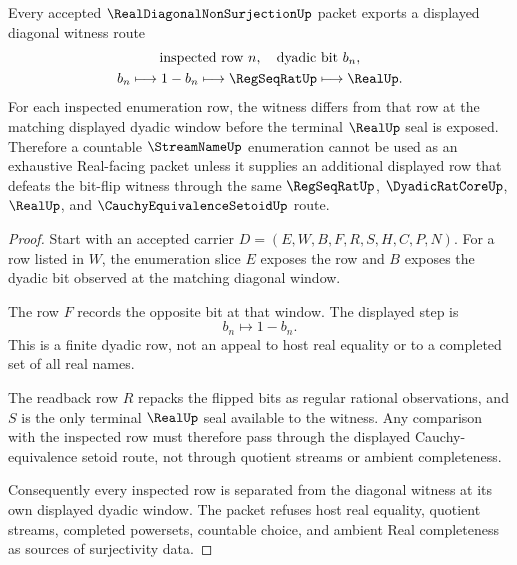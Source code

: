 \begin{theorem}
\label{thm:real-diagonal-non-surjection-diagonal-witness}
Every accepted $\RealDiagonalNonSurjectionUp$ packet exports a displayed diagonal witness route
$$
\begin{gathered}
\text{inspected row } n,\quad \text{dyadic bit } b_n,\\
b_n \longmapsto 1-b_n \longmapsto \RegSeqRatUp \longmapsto \RealUp .
\end{gathered}
$$
For each inspected enumeration row, the witness differs from that row at the matching displayed dyadic window before the terminal $\RealUp$ seal is exposed. Therefore a countable $\StreamNameUp$ enumeration cannot be used as an exhaustive Real-facing packet unless it supplies an additional displayed row that defeats the bit-flip witness through the same $\RegSeqRatUp$, $\DyadicRatCoreUp$, $\RealUp$, and $\CauchyEquivalenceSetoidUp$ route.
\end{theorem}
\begin{proof}
Start with an accepted carrier $D=(E,W,B,F,R,S,H,C,P,N)$. For a row listed in $W$, the enumeration slice $E$ exposes the row and $B$ exposes the dyadic bit observed at the matching diagonal window.

The row $F$ records the opposite bit at that window. The displayed step is
$$
b_n \longmapsto 1-b_n .
$$
This is a finite dyadic row, not an appeal to host real equality or to a completed set of all real names.

The readback row $R$ repacks the flipped bits as regular rational observations, and $S$ is the only terminal $\RealUp$ seal available to the witness. Any comparison with the inspected row must therefore pass through the displayed Cauchy-equivalence setoid route, not through quotient streams or ambient completeness.

Consequently every inspected row is separated from the diagonal witness at its own displayed dyadic window. The packet refuses host real equality, quotient streams, completed powersets, countable choice, and ambient Real completeness as sources of surjectivity data.
\end{proof}

